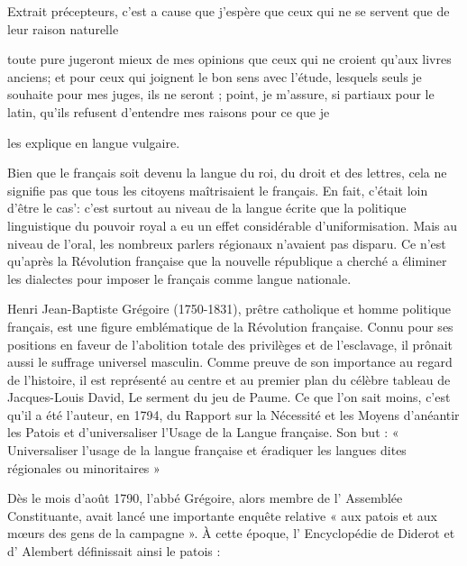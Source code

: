 
\begin{lecture}{Extrait}
précepteurs, c’est a cause que j’espère que ceux qui ne se servent que de leur raison naturelle
\end{lecture}

toute pure jugeront mieux de mes opinions que ceux qui ne croient qu’aux livres anciens; et pour ceux qui joignent le bon sens avec l’étude, lesquels seuls je souhaite pour mes juges, ils ne seront ; point, je m’assure, si partiaux pour le latin, qu’ils refusent d’entendre mes raisons pour ce que je


les explique en langue vulgaire.



Bien que le français soit devenu la langue du roi, du droit et des lettres, cela ne signifie pas que tous les citoyens maîtrisaient le français. En fait, c’était loin d’être le cas’: c’est surtout au niveau de la langue écrite que la politique linguistique du pouvoir royal a eu un effet considérable d’uniformisation. Mais au niveau de l’oral, les nombreux parlers régionaux n’avaient pas disparu. Ce n’est qu’après la Révolution française que la nouvelle république a cherché a éliminer les dialectes pour imposer le français comme langue nationale.



Henri Jean-Baptiste Grégoire (1750-1831), prêtre catholique et homme politique français, est une figure emblématique de la Révolution française. Connu pour ses positions en faveur de l’abolition totale des privilèges et de l’esclavage, il prônait aussi le suffrage universel masculin. Comme preuve de son importance au regard de l’histoire, il est représenté au centre et au premier plan du célèbre tableau de Jacques-Louis David, Le serment du jeu de Paume. Ce que l’on sait moins, c’est qu’il a été l’auteur, en 1794, du Rapport sur la Nécessité et les Moyens d’anéantir les Patois et d’universaliser l’Usage de la Langue française. Son but : « Universaliser l’usage de la langue française et éradiquer les langues dites régionales ou minoritaires »



Dès le mois d’août 1790, l’abbé Grégoire, alors membre de l’ Assemblée Constituante, avait lancé une importante enquête relative « aux patois et aux mœurs des gens de la campagne ». À cette époque, l’ Encyclopédie de Diderot et d’ Alembert définissait ainsi le patois :


